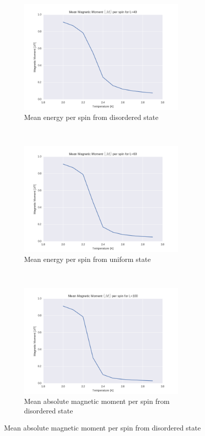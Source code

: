 \documentclass[a4paper, 10pt]{article}
\begin{document}
\begin{figure}[!ht]
    \centering
    \begin{subfigure}[H!]{0.5\textwidth}
        \centering
        \includegraphics[height=2.2in]{meanMagMonl40Ne5.png}
        \caption{Mean energy per spin from disordered state}
    \end{subfigure}%
    ~ 
    \begin{subfigure}[H!]{0.5\textwidth}
        \centering
        \includegraphics[height=2.2in]{meanMagMoml60Ne5.png}
        \caption{Mean energy per spin from uniform state}
    \end{subfigure}
        ~
     \begin{subfigure}[H!]{0.5\textwidth}
        \centering
        \includegraphics[height=2.2in]{meanMagMoml100Ne5.png}
        \caption{Mean absolute magnetic moment per spin from disordered state}
    \end{subfigure}%

\end{figure}
\end{document}
